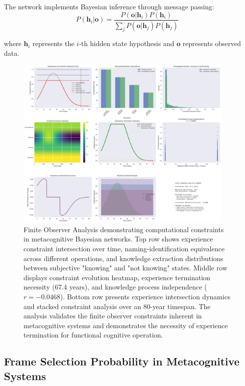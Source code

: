 \documentclass[12pt,a4paper]{article}
\begin{document}
The network implements Bayesian inference through message passing:
\begin{equation}
P(\mathbf{h}_i | \mathbf{o}) = \frac{P(\mathbf{o} | \mathbf{h}_i) P(\mathbf{h}_i)}{\sum_j P(\mathbf{o} | \mathbf{h}_j) P(\mathbf{h}_j)}
\end{equation}

where $\mathbf{h}_i$ represents the $i$-th hidden state hypothesis and $\mathbf{o}$ represents observed data.


\begin{figure}[htbp]
    \centering
    \includegraphics[width=0.95\textwidth]{images/finite_observer_analysis_20250925_190027.png}
    \caption{Finite Observer Analysis demonstrating computational constraints in metacognitive Bayesian networks. Top row shows experience constraint intersection over time, naming-identification equivalence across different operations, and knowledge extraction distributions between subjective "knowing" and "not knowing" states. Middle row displays constraint evolution heatmap, experience termination necessity (67.4 years), and knowledge process independence ($r = -0.0468$). Bottom row presents experience intersection dynamics and stacked constraint analysis over an 80-year timespan. The analysis validates the finite observer constraints inherent in metacognitive systems and demonstrates the necessity of experience termination for functional cognitive operation.}
    \label{fig:finite_observer}
    \end{figure}



\subsection{Frame Selection Probability in Metacognitive Systems}
\end{document}
